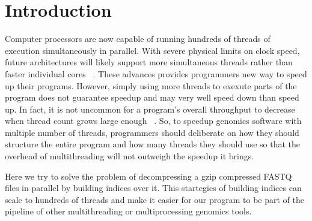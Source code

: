 \documentclass[unnumsec,webpdf,contemporary,large]{oup-authoring-template}
\begin{document}
\section{Introduction}
Computer processors are now capable of running hundreds of threads of execution simultaneously in parallel. With severe physical limits on clock speed, future architectures will likely support more simultaneous threads rather than faster individual cores ~\cite{intropaper}. These advances provides programmers new way to speed up their programs. However, simply using more threads to exexute parts of the program does not guarantee speedup and may very well speed down than speed up. In fact, it is not uncommon for a program’s overall throughput to decrease when thread count grows large enough ~\cite{intropaper}. So, to speedup genomics software with multiple number of threads, programmers should deliberate on how they should structure the entire program and how many threads they should use so that the overhead of multithreading will not outweigh the speedup it brings.

Here we try to solve the problem of decompressing a gzip compressed FASTQ files in parallel by building indices over it. 
This startegies of building indices can scale to hundreds of threads and make it easier for our program to be part of the pipeline of other multithreading or multiprocessing genomics tools. 
\end{document}
